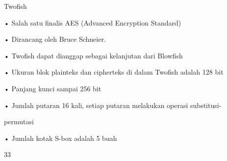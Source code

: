 \documentclass{article}
\begin{document}

Twofish

• Salah satu finalis AES (Advanced Encryption Standard)

• Dirancang oleh Bruce Schneier.

• Twofish dapat dianggap sebagai kelanjutan dari Blowfish

• Ukuran blok plainteks dan cipherteks di dalam Twofish adalah 128 bit

• Panjang kunci sampai 256 bit

• Jumlah putaran 16 kali, setiap putaran melakukan operasi substitusi-

permutasi

• Jumlah kotak S-box adalah 5 buah 

33
\end{document}

